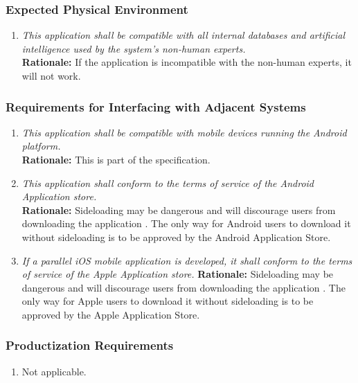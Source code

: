 \documentclass[]{article}
\begin{document}
\subsubsection{Expected Physical Environment}
\label{ssub:expected_physical_environment}
\begin{enumerate}[{OE-EPE}1. ]
	\item \textit{This application shall be compatible with all internal databases and artificial intelligence used by the system's non-human experts.} \\ \textbf{Rationale:} If the application is incompatible with the non-human experts, it will not work.
\end{enumerate}

\subsubsection{Requirements for Interfacing with Adjacent Systems}
\label{ssub:requirements_for_interfacing_with_adjacent_systems}
\begin{enumerate}[{OE-IA}1. ]
	\item \textit{This application shall be compatible with mobile devices running the Android platform.} \\ \textbf{Rationale:} This is part of the specification.
        \item \textit{This application shall conform to the terms of service of the Android Application store.} \\ \textbf{Rationale:} Sideloading may be dangerous and will discourage users from downloading the application \cite{Trio}. The only way for Android users to download it without sideloading is to be approved by the Android Application Store.
        \item \textit{If a parallel iOS mobile application is developed, it shall conform to the terms of service of the Apple Application store.} \textbf{Rationale:} Sideloading may be dangerous and will discourage users from downloading the application \cite{Trio}. The only way for Apple users to download it without sideloading is to be approved by the Apple Application Store.
    
\end{enumerate}

\subsubsection{Productization Requirements}
\label{ssub:productization_requirements}
\begin{enumerate}[{OE-P}1. ]
	\item Not applicable.
\end{enumerate}
\end{document}
